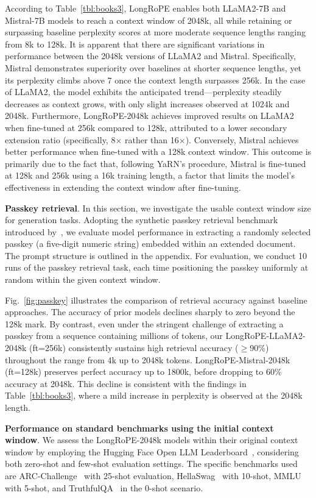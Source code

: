 According to Table~\ref{tbl:books3}, LongRoPE enables both LLaMA2-7B and Mistral-7B models to reach a context window of 2048k, all while retaining or surpassing baseline perplexity scores at more moderate sequence lengths ranging from 8k to 128k. It is apparent that there are significant variations in performance between the 2048k versions of LLaMA2 and Mistral. Specifically, Mistral demonstrates superiority over baselines at shorter sequence lengths, yet its perplexity climbs above 7 once the context length surpasses 256k. In the case of LLaMA2, the model exhibits the anticipated trend—perplexity steadily decreases as context grows, with only slight increases observed at 1024k and 2048k. Furthermore, LongRoPE-2048k achieves improved results on LLaMA2 when fine-tuned at 256k compared to 128k, attributed to a lower secondary extension ratio (specifically, 8$\times$ rather than 16$\times$). Conversely, Mistral achieves better performance when fine-tuned with a 128k context window. This outcome is primarily due to the fact that, following YaRN's procedure, Mistral is fine-tuned at 128k and 256k using a 16k training length, a factor that limits the model's effectiveness in extending the context window after fine-tuning.

\textbf{Passkey retrieval}. In this section, we investigate the usable context window size for generation tasks. Adopting the synthetic passkey retrieval benchmark introduced by~\cite{passkey}, we evaluate model performance in extracting a randomly selected passkey (a five-digit numeric string) embedded within an extended document. The prompt structure is outlined in the appendix. For evaluation, we conduct 10 runs of the passkey retrieval task, each time positioning the passkey uniformly at random within the given context window.

Fig.~\ref{fig:passkey} illustrates the comparison of retrieval accuracy against baseline approaches. The accuracy of prior models declines sharply to zero beyond the 128k mark. By contrast, even under the stringent challenge of extracting a passkey from a sequence containing millions of tokens, our LongRoPE-LLaMA2-2048k (ft=256k) consistently sustains high retrieval accuracy ($\ge$90\%) throughout the range from 4k up to 2048k tokens. LongRoPE-Mistral-2048k (ft=128k) preserves perfect accuracy up to 1800k, before dropping to 60\% accuracy at 2048k. This decline is consistent with the findings in Table~\ref{tbl:books3}, where a mild increase in perplexity is observed at the 2048k length.

\textbf{Performance on standard benchmarks using the initial context window}. We assess the LongRoPE-2048k models within their original context window by employing the Hugging Face Open LLM Leaderboard~\cite{huggingfaceboard}, considering both zero-shot and few-shot evaluation settings. The specific benchmarks used are ARC-Challenge~\cite{allenai:arc} with 25-shot evaluation, HellaSwag~\cite{zellers2019hellaswag} with 10-shot, MMLU~\cite{mmlu} with 5-shot, and TruthfulQA~\cite{lin2021truthfulqa} in the 0-shot scenario.

